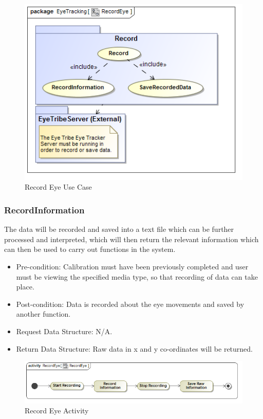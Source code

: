 \begin{figure}[!ht]
	\centering 
	\includegraphics[scale=0.5,width=15cm,keepaspectratio]{Diagrams/Use_Case_Diagram__RecordEye.png}
	\caption{Record Eye Use Case}
	\label{RecordEye}
	\end{figure}
	
\subsubsection{RecordInformation}
The data will be recorded and saved into a text file which can be further processed and interpreted, which will then return the relevant information which can then be used to carry out functions in the system.
\begin{itemize}
\item Pre-condition: Calibration must have been previously completed and user must be viewing the specified media type, so that recording of data can take place.
\item Post-condition: Data is recorded about the eye movements and saved by another function.
\item Request Data Structure: N/A.
\item Return Data Structure: Raw data in x and y co-ordinates will be returned.
\end{itemize}

\begin{figure}[!ht]
	\centering
	\includegraphics[scale=0.5,width=15cm,keepaspectratio]{Diagrams/Activity_Diagram__RecordEye__RecordEye.png}
	\caption{Record Eye Activity}
	\end{figure}

